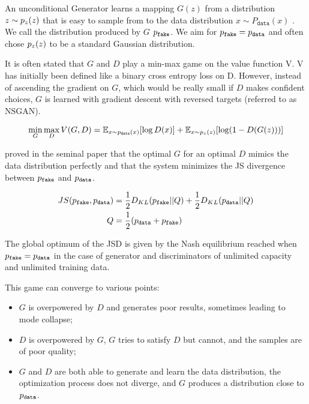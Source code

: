 An unconditional Generator learns a mapping $G(z)$ from a distribution $z \sim p_z(z)$ that is easy to sample from to the data distribution $x \sim P_{\texttt{data}}(x)$ \citep{gan}. We call the distribution produced by $G$ $p_\texttt{fake}$. We aim for $p_\texttt{fake} = p_\texttt{data}$ and often chose $p_z(z)$ to be a standard Gaussian distribution.

It is often stated that $G$ and $D$ play a min-max game on the value function V. V has initially been defined like a binary cross entropy loss on D. However, instead of ascending the gradient on $G$, which would be really small if $D$ makes confident choices, $G$ is learned with gradient descent with reversed targets (referred to as \ac{NSGAN}).

\begin{equation}
    \min_G \max_D V(G, D) = \mathbb{E}_{x \sim p_\texttt{data}(x)}[\log D(x)] + \mathbb{E}_{x\sim p_z(z)}[\log (1 - D(G(z)))]
\end{equation}

\citet{gan} proved in the seminal paper that the optimal $G$ for an optimal $D$ mimics the data distribution perfectly and that the system minimizes the \ac{JS} divergence between $p_\texttt{fake}$ and $p_\texttt{data}$.

\begin{equation}
    \begin{split}
    JS(p_\texttt{fake}, p_\texttt{data}) &= \frac{1}{2}D_{KL}(p_\texttt{fake} || Q) + \frac{1}{2} D_{KL}(p_\texttt{data} || Q) \\
    Q&=\frac{1}{2}(p_\texttt{data} + p_\texttt{fake})
\end{split}
\end{equation}

The global optimum of the JSD is given by the Nash equilibrium reached when $p_\texttt{fake} = p_\texttt{data}$ in the case of generator and discriminators of unlimited capacity and unlimited training data.

This game can converge to various points:

\begin{itemize}
    \item $G$ is overpowered by $D$ and generates poor results, sometimes leading to mode collapse;
    \item $D$ is overpowered by $G$, $G$ tries to satisfy $D$ but cannot, and the samples are of poor quality;
    \item $G$ and $D$ are both able to generate and learn the data distribution, the optimization process does not diverge, and $G$ produces a distribution close to $p_\texttt{data}$.
\end{itemize}

